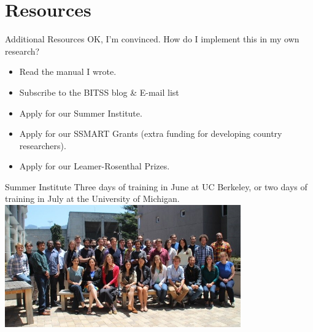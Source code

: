 \documentclass{beamer}
\begin{document}
\section{Resources}
\begin{frame}{Additional Resources}
OK, I'm convinced. How do I implement this in my own research?

\begin{itemize}[<.->]
\item Read the manual I wrote.\href{https://github.com/garretchristensen/BestPracticesManual}{}
\item Subscribe to the BITSS blog \& E-mail list \href{https://bitss.org/blog}{}
\item Apply for our Summer Institute. \href{http://www.bitss.org/events/summer-institute/}{}
\item Apply for our SSMART Grants (extra funding for developing country researchers). \href{http://www.bitss.org/ssmart-grants/}{}

\item Apply for our Leamer-Rosenthal Prizes. \href{http://www.bitss.org/lr-prizes/}{}
\end{itemize}
\end{frame}

\begin{frame}{Summer Institute}
Three days of training in June at UC Berkeley, or two days of training in July at the University of Michigan.
\includegraphics[width=4in]{../Images/bitss-2014-cohort2.jpg}
\end{frame}
\end{document}
